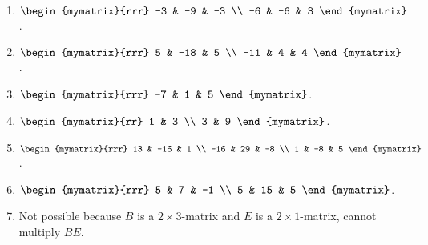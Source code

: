 \begin{ex}
  \begin{sol}
    \begin{enumerate}
    \item $\begin{mymatrix}{rrr}
        -3 & -9 & -3 \\
        -6 & -6 & 3
      \end{mymatrix}$.
    \item $\begin{mymatrix}{rrr}
        5 & -18 & 5 \\
        -11 & 4 & 4
      \end{mymatrix}$.
    \item $\begin{mymatrix}{rrr}
        -7 & 1 & 5
      \end{mymatrix}$.
    \item $\begin{mymatrix}{rr}
        1 & 3 \\
        3 & 9
      \end{mymatrix}$.
    \item $\begin{mymatrix}{rrr}
        13 & -16 & 1 \\
        -16 & 29 & -8 \\
        1 & -8 & 5
      \end{mymatrix}$.
    \item $\begin{mymatrix}{rrr}
        5 & 7 & -1 \\
        5 & 15 & 5
      \end{mymatrix}$.
    \item Not possible because $B$ is a $2\times 3$-matrix and $E$ is
      a $2\times 1$-matrix, cannot multiply $BE$.
    \end{enumerate}
  \end{sol}
\end{ex}

